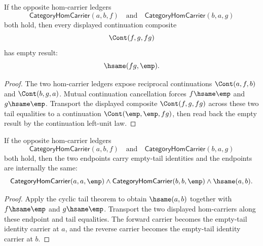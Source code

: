 \begin{theorem}
\label{thm:category-hom-carrier-comp-cycle-result-empty}
If the opposite hom-carrier ledgers
$$
\mathsf{CategoryHomCarrier}(a,b,f)
\quad\text{and}\quad
\mathsf{CategoryHomCarrier}(b,a,g)
$$
both hold, then every displayed continuation composite
$$
\Cont(f,g,fg)
$$
has empty result:
$$
\hsame(fg,\emp).
$$
\end{theorem}
\begin{proof}
The two hom-carrier ledgers expose reciprocal continuations
$\Cont(a,f,b)$ and $\Cont(b,g,a)$. Mutual continuation cancellation forces
$f\hsame\emp$ and $g\hsame\emp$. Transport the displayed composite
$\Cont(f,g,fg)$ across these two tail equalities to a continuation
$\Cont(\emp,\emp,fg)$, then read back the empty result by the continuation
left-unit law.
\end{proof}

\begin{theorem}
\label{thm:category-hom-carrier-cycle-identity-carriers}
If the opposite hom-carrier ledgers
$$
\mathsf{CategoryHomCarrier}(a,b,f)
\quad\text{and}\quad
\mathsf{CategoryHomCarrier}(b,a,g)
$$
both hold, then the two endpoints carry empty-tail identities and the endpoints
are internally the same:
$$
\mathsf{CategoryHomCarrier}(a,a,\emp)\land
\mathsf{CategoryHomCarrier}(b,b,\emp)\land
\hsame(a,b).
$$
\end{theorem}
\begin{proof}
Apply the cyclic tail theorem to obtain $\hsame(a,b)$ together with
$f\hsame\emp$ and $g\hsame\emp$. Transport the two displayed hom-carriers along
these endpoint and tail equalities. The forward carrier becomes the empty-tail
identity carrier at $a$, and the reverse carrier becomes the empty-tail
identity carrier at $b$.
\end{proof}

